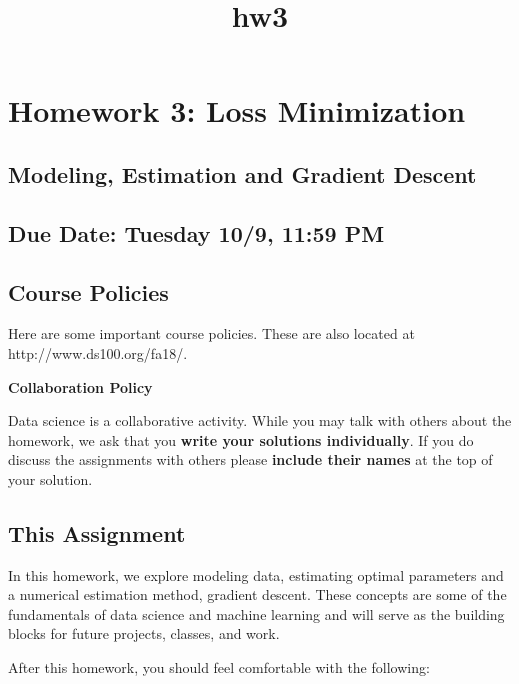 \documentclass[11pt]{article}
\title{hw3}
\begin{document}
    
    
    \maketitle
    
    

    
    \section{Homework 3: Loss
Minimization}\label{homework-3-loss-minimization}

\subsection{Modeling, Estimation and Gradient
Descent}\label{modeling-estimation-and-gradient-descent}

\subsection{Due Date: Tuesday 10/9, 11:59
PM}\label{due-date-tuesday-109-1159-pm}

\subsection{Course Policies}\label{course-policies}

Here are some important course policies. These are also located at
http://www.ds100.org/fa18/.

\textbf{Collaboration Policy}

Data science is a collaborative activity. While you may talk with others
about the homework, we ask that you \textbf{write your solutions
individually}. If you do discuss the assignments with others please
\textbf{include their names} at the top of your solution.

\subsection{This Assignment}\label{this-assignment}

In this homework, we explore modeling data, estimating optimal
parameters and a numerical estimation method, gradient descent. These
concepts are some of the fundamentals of data science and machine
learning and will serve as the building blocks for future projects,
classes, and work.

After this homework, you should feel comfortable with the following:
\end{document}
